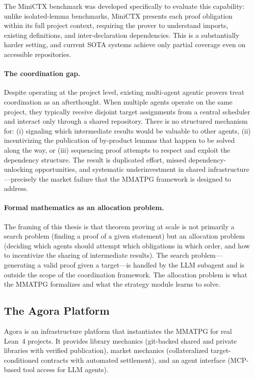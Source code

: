 The MiniCTX benchmark \citep{hu2024minictx} was developed specifically to evaluate this capability: unlike isolated-lemma benchmarks, MiniCTX presents each proof obligation within its full project context, requiring the prover to understand imports, existing definitions, and inter-declaration dependencies. This is a substantially harder setting, and current SOTA systems achieve only partial coverage even on accessible repositories.

\paragraph{The coordination gap.}
Despite operating at the project level, existing multi-agent agentic provers treat coordination as an afterthought. When multiple agents operate on the same project, they typically receive disjoint target assignments from a central scheduler and interact only through a shared repository. There is no structured mechanism for: (i) signaling which intermediate results would be valuable to other agents, (ii) incentivizing the publication of by-product lemmas that happen to be solved along the way, or (iii) sequencing proof attempts to respect and exploit the dependency structure. The result is duplicated effort, missed dependency-unlocking opportunities, and systematic underinvestment in shared infrastructure---precisely the market failure that the MMATPG framework is designed to address.

\paragraph{Formal mathematics as an allocation problem.}
The framing of this thesis is that theorem proving at scale is not primarily a search problem (finding a proof of a given statement) but an allocation problem (deciding which agents should attempt which obligations in which order, and how to incentivize the sharing of intermediate results). The search problem---generating a valid proof given a target---is handled by the LLM subagent and is outside the scope of the coordination framework. The allocation problem is what the MMATPG formalizes and what the strategy module learns to solve.


\subsection{The Agora Platform}\label{sec:agora}

Agora is an infrastructure platform that instantiates the MMATPG for real Lean~4 projects. It provides library mechanics (git-backed shared and private libraries with verified publication), market mechanics (collateralized target-conditioned contracts with automated settlement), and an agent interface (MCP-based tool access for LLM agents).

